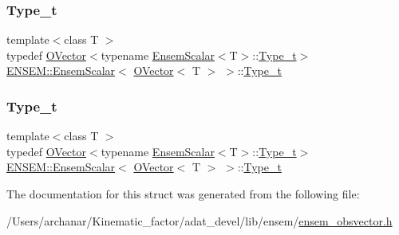\subsubsection{\texorpdfstring{Type\_t}{Type\_t}\hspace{0.1cm}{\footnotesize\ttfamily [1/2]}}
{\footnotesize\ttfamily template$<$class T $>$ \\
typedef \mbox{\hyperlink{classENSEM_1_1OVector}{O\+Vector}}$<$typename \mbox{\hyperlink{structENSEM_1_1EnsemScalar}{Ensem\+Scalar}}$<$T$>$\+::\mbox{\hyperlink{structENSEM_1_1EnsemScalar_3_01OVector_3_01T_01_4_01_4_a5b4151f8ecc24331a77edc8130f525f7}{Type\+\_\+t}}$>$ \mbox{\hyperlink{structENSEM_1_1EnsemScalar}{E\+N\+S\+E\+M\+::\+Ensem\+Scalar}}$<$ \mbox{\hyperlink{classENSEM_1_1OVector}{O\+Vector}}$<$ T $>$ $>$\+::\mbox{\hyperlink{structENSEM_1_1EnsemScalar_3_01OVector_3_01T_01_4_01_4_a5b4151f8ecc24331a77edc8130f525f7}{Type\+\_\+t}}}

\mbox{\label{structENSEM_1_1EnsemScalar_3_01OVector_3_01T_01_4_01_4_a5b4151f8ecc24331a77edc8130f525f7}} 
\subsubsection{\texorpdfstring{Type\_t}{Type\_t}\hspace{0.1cm}{\footnotesize\ttfamily [2/2]}}
{\footnotesize\ttfamily template$<$class T $>$ \\
typedef \mbox{\hyperlink{classENSEM_1_1OVector}{O\+Vector}}$<$typename \mbox{\hyperlink{structENSEM_1_1EnsemScalar}{Ensem\+Scalar}}$<$T$>$\+::\mbox{\hyperlink{structENSEM_1_1EnsemScalar_3_01OVector_3_01T_01_4_01_4_a5b4151f8ecc24331a77edc8130f525f7}{Type\+\_\+t}}$>$ \mbox{\hyperlink{structENSEM_1_1EnsemScalar}{E\+N\+S\+E\+M\+::\+Ensem\+Scalar}}$<$ \mbox{\hyperlink{classENSEM_1_1OVector}{O\+Vector}}$<$ T $>$ $>$\+::\mbox{\hyperlink{structENSEM_1_1EnsemScalar_3_01OVector_3_01T_01_4_01_4_a5b4151f8ecc24331a77edc8130f525f7}{Type\+\_\+t}}}



The documentation for this struct was generated from the following file\+:\begin{DoxyCompactItemize}
\item 
/\+Users/archanar/\+Kinematic\+\_\+factor/adat\+\_\+devel/lib/ensem/\mbox{\hyperlink{lib_2ensem_2ensem__obsvector_8h}{ensem\+\_\+obsvector.\+h}}\end{DoxyCompactItemize}
